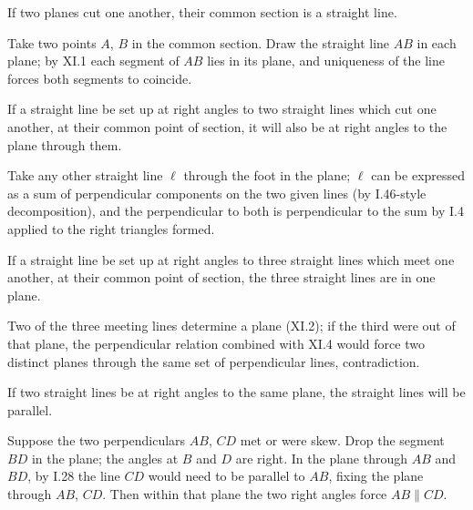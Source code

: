 \documentclass{rrxiv}
\begin{document}
\begin{claim}
\label{prop:XI.3}
If two planes cut one another, their common section is a straight
line.
\end{claim}
\begin{evidence}[Proof of XI.3]
\label{ev:XI.3}
Take two points $A$, $B$ in the common section.  Draw the straight
line $AB$ in each plane; by XI.1 each segment of $AB$ lies in its
plane, and uniqueness of the line forces both segments to coincide.
\end{evidence}

\begin{claim}
\label{prop:XI.4}
If a straight line be set up at right angles to two straight lines
which cut one another, at their common point of section, it will
also be at right angles to the plane through them.
\end{claim}
\begin{evidence}[Proof of XI.4]
\label{ev:XI.4}
Take any other straight line $\ell$ through the foot in the plane;
$\ell$ can be expressed as a sum of perpendicular components on the
two given lines (by I.46-style decomposition), and the perpendicular
to both is perpendicular to the sum by I.4 applied to the right
triangles formed.
\end{evidence}

\begin{claim}
\label{prop:XI.5}
If a straight line be set up at right angles to three straight lines
which meet one another, at their common point of section, the three
straight lines are in one plane.
\end{claim}
\begin{evidence}[Proof of XI.5]
\label{ev:XI.5}
Two of the three meeting lines determine a plane (XI.2); if the
third were out of that plane, the perpendicular relation combined
with XI.4 would force two distinct planes through the same set of
perpendicular lines, contradiction.
\end{evidence}

\begin{claim}
\label{prop:XI.6}
If two straight lines be at right angles to the same plane, the
straight lines will be parallel.
\end{claim}
\begin{evidence}[Proof of XI.6]
\label{ev:XI.6}
Suppose the two perpendiculars $AB$, $CD$ met or were skew.  Drop
the segment $BD$ in the plane; the angles at $B$ and $D$ are right.
In the plane through $AB$ and $BD$, by I.28 the line $CD$ would
need to be parallel to $AB$, fixing the plane through $AB$, $CD$.
Then within that plane the two right angles force $AB \parallel CD$.
\end{evidence}
\end{document}
